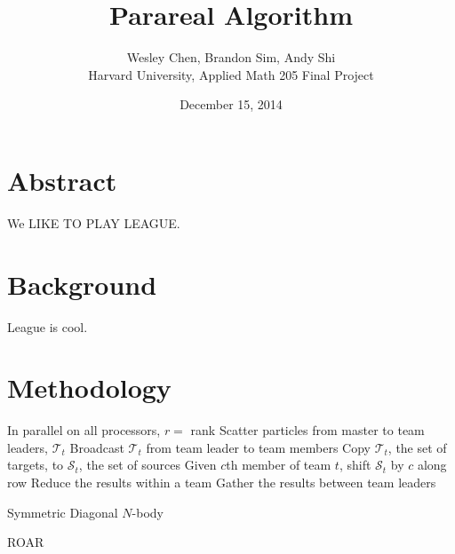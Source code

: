 \documentclass[letterpaper,twocolumn,11pt]{article}
\begin{document}
\title{Parareal Algorithm}
\author{Wesley Chen, Brandon Sim, Andy Shi \\
Harvard University, Applied Math 205 Final Project}
\date{December 15, 2014}
\maketitle

\setlength\parindent{0pt}

\setlength\parskip{2ex}


\section{Abstract}

We LIKE TO PLAY LEAGUE. 

\section{Background}

League is cool.

\section{Methodology}

\begin{algorithm}[t]
 In parallel on all processors, $r = $ rank\;
 Scatter particles from master to team leaders, $\mathcal{T}_t$\;
 Broadcast $\mathcal{T}_t$ from team leader to team members\;
 Copy $\mathcal{T}_t$, the set of targets, to $\mathcal{S}_t$, the set of sources\;
 Given $c$th member of team $t$, shift $\mathcal{S}_t$ by $c$ along row\;
 Reduce the results within a team\;
 Gather the results between team leaders\;
 \caption{Symmetric Diagonal $N$-body}
 \label{alg:symmdiag}
\end{algorithm}

ROAR
\end{document}
